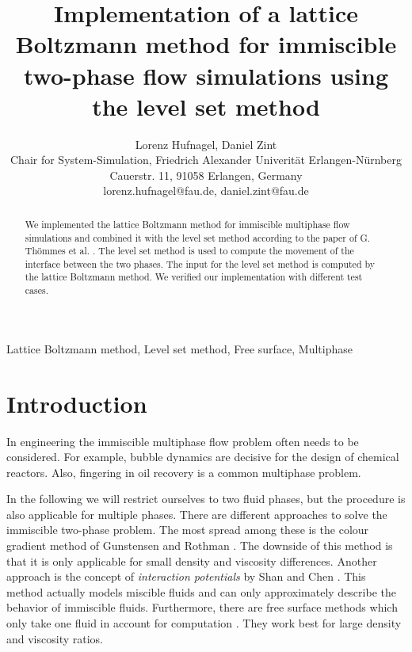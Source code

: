 \documentclass[final,leqno,onefignum,onetabnum]{siamltexmm}
\title{Implementation of a lattice Boltzmann method for immiscible two-phase flow simulations using the level set method}
\author
{Lorenz Hufnagel, Daniel Zint\\
Chair for System-Simulation, Friedrich Alexander Univerit\"at Erlangen-N\"urnberg\\
Cauerstr. 11, 91058 Erlangen, Germany\\
lorenz.hufnagel@fau.de, daniel.zint@fau.de %
}
\begin{document}
\maketitle
\newcommand{\slugmaster}{%
\slugger{siads}{xxxx}{xx}{x}{x--x}}%

\begin{abstract}
	We implemented the lattice Boltzmann method for immiscible multiphase flow simulations and combined it with the level set method according to the paper of G. Th\"ommes et al. \cite{Thoemmes}. The level set method is used to compute the movement of the interface between the two phases. The input for the level set method is computed by the lattice Boltzmann method. We verified our implementation with different test cases.
\end{abstract}

\begin{keywords}
	Lattice Boltzmann method,
	Level set method,
	Free surface,
	Multiphase
\end{keywords}

\begin{AMS}\end{AMS}


\pagestyle{myheadings}
\thispagestyle{plain}

\section{Introduction}
In engineering the immiscible multiphase flow problem often needs to be considered. For example, bubble dynamics are decisive for the design of chemical reactors. Also, fingering in oil recovery is a common multiphase problem.

In the following we will restrict ourselves to two fluid phases, but the procedure is also applicable for multiple phases. 
There are different approaches to solve the immiscible two-phase problem. The most spread among these is the colour gradient method of Gunstensen and Rothman \cite{GRcg1,GRcg2,GRcg3}. The downside of this method is that it is only applicable for small density and viscosity differences. Another approach is the concept of {\it interaction potentials} by Shan and Chen \cite{ShanChen1,ShanChen2}. This method actually models miscible fluids and can only approximately describe the behavior of immiscible fluids. Furthermore, there are free surface methods which only take one fluid in account for computation \cite{Koerner}. They work best for large density and viscosity ratios.
\end{document}
